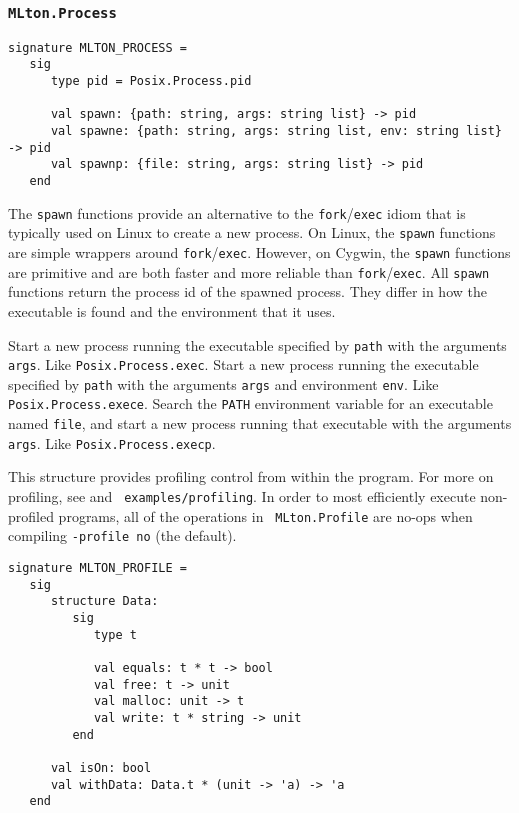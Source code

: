 \subsubsection{\tt MLton.Process}

\begin{verbatim}
signature MLTON_PROCESS =
   sig
      type pid = Posix.Process.pid

      val spawn: {path: string, args: string list} -> pid
      val spawne: {path: string, args: string list, env: string list} -> pid
      val spawnp: {file: string, args: string list} -> pid
   end
\end{verbatim}

The {\tt spawn} functions provide an alternative to the {\tt fork}/{\tt exec}
idiom that is typically used on Linux to create a new process.  On Linux, the
{\tt spawn} functions are simple wrappers around {\tt fork}/{\tt exec}.
However, on Cygwin, the {\tt spawn} functions are primitive and are both faster
and more reliable than {\tt fork}/{\tt exec}.  All {\tt spawn} functions return
the process id of the spawned process.  They differ in how the executable is
found and the environment that it uses.

\begin{description}
Start a new process running the executable specified by {\tt path} with the
arguments {\tt args}.  Like {\tt Posix.Process.exec}.
Start a new process running the executable specified by {\tt path} with the
arguments {\tt args} and environment {\tt env}.  Like {\tt Posix.Process.exece}.
Search the {\tt PATH} environment variable for an executable named {\tt file},
and start a new process running that executable with the arguments {\tt args}.
Like {\tt Posix.Process.execp}.
\end{description}

This structure provides profiling control from within the program.
For more on profiling, see  and {\tt
examples/profiling}. In order to most efficiently execute
non-profiled programs, all of the operations in {\tt
MLton.Profile} are no-ops when compiling {\tt -profile no} (the
default).

\begin{verbatim}
signature MLTON_PROFILE =
   sig
      structure Data:
         sig
            type t

            val equals: t * t -> bool
            val free: t -> unit
            val malloc: unit -> t
            val write: t * string -> unit
         end

      val isOn: bool
      val withData: Data.t * (unit -> 'a) -> 'a
   end
\end{verbatim}

